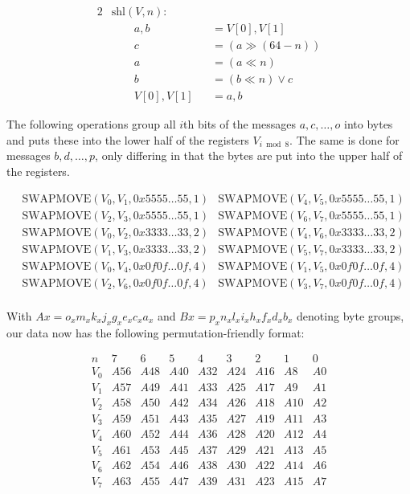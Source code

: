 \documentclass[12pt]{report}
\begin{document}
\begin{alignat*}{2}
    &\text{shl}(V,n): \\
    &\qquad a,b&&=V[0],V[1] \\
    &\qquad c&&=(a\gg (64-n)) \\
    &\qquad a&&=(a\ll n) \\
    &\qquad b&&=(b\ll n)\lor c \\
    &\qquad V[0],V[1]&&=a,b
\end{alignat*}

The following operations group all $i$th bits of the messages $a,c,\dots,o$
into bytes and puts these into the lower half of the registers $V_{i\bmod 8}$.
The same is done for messages $b,d,\dots,p$, only differing in that the bytes
are put into the upper half of the registers.

\begin{align*}
    &\text{SWAPMOVE}(V_0,V_1,0x5555\dots 55,1) &\text{SWAPMOVE}(V_4,V_5,0x5555\dots 55,1) \\
    &\text{SWAPMOVE}(V_2,V_3,0x5555\dots 55,1) &\text{SWAPMOVE}(V_6,V_7,0x5555\dots 55,1) \\
    &\text{SWAPMOVE}(V_0,V_2,0x3333\dots 33,2) &\text{SWAPMOVE}(V_4,V_6,0x3333\dots 33,2) \\
    &\text{SWAPMOVE}(V_1,V_3,0x3333\dots 33,2) &\text{SWAPMOVE}(V_5,V_7,0x3333\dots 33,2) \\
    &\text{SWAPMOVE}(V_0,V_4,0x0f0f\dots 0f,4) &\text{SWAPMOVE}(V_1,V_5,0x0f0f\dots 0f,4) \\
    &\text{SWAPMOVE}(V_2,V_6,0x0f0f\dots 0f,4) &\text{SWAPMOVE}(V_3,V_7,0x0f0f\dots 0f,4) \\
\end{align*}

With $Ax=o_xm_xk_xj_xg_xe_xc_xa_x$ and $Bx=p_xn_xl_xi_xh_xf_xd_xb_x$ denoting
byte groups, our data now has the following permutation-friendly format:

\[
    \begin{array}{c|llllllll}
        n & 7 & 6 & 5 & 4 & 3 & 2 & 1 & 0 \\
        \hline
        V_0 & A56 & A48 & A40 & A32 & A24 & A16 & A8 & A0 \\
        V_1 & A57 & A49 & A41 & A33 & A25 & A17 & A9 & A1 \\
        V_2 & A58 & A50 & A42 & A34 & A26 & A18 & A10 & A2 \\
        V_3 & A59 & A51 & A43 & A35 & A27 & A19 & A11 & A3 \\
        V_4 & A60 & A52 & A44 & A36 & A28 & A20 & A12 & A4 \\
        V_5 & A61 & A53 & A45 & A37 & A29 & A21 & A13 & A5 \\
        V_6 & A62 & A54 & A46 & A38 & A30 & A22 & A14 & A6 \\
        V_7 & A63 & A55 & A47 & A39 & A31 & A23 & A15 & A7
    \end{array}
\]
\end{document}
